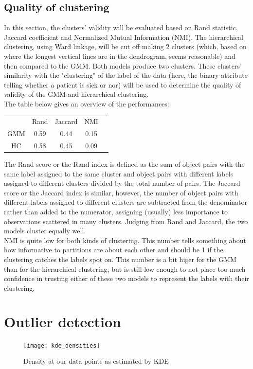\subsection{Quality of clustering}
In this section, the clusters' validity will be evaluated based on Rand statistic,
Jaccard coefficient and Normalized Mutual Information (NMI). The hierarchical clustering,
using Ward linkage, will be cut off making 2 clusters (which, based on where the
longest vertical lines are in the dendrogram, seems reasonable) and then
compared to the GMM. Both models produce two clusters. These clusters' similarity
with the "clustering" of the label of the data (here, the binary attribute telling
whether a patient is sick or nor) will be used to determine the quality of validity
of the GMM and hierarchical clustering.\\
 The table below gives an overview of the performances:\\
\begin{table}[h]
\centering
\begin{tabular}{ccccc}
    & Rand & Jaccard & NMI\\
GMM & 0.59 & 0.44 & 0.15 \\
HC & 0.58 & 0.45 & 0.09 \\
\end{tabular}
\end{table}

The Rand score or the Rand index is defined as the sum of object pairs with
the same label assigned to the same cluster and object pairs with different
labels assigned to different clusters divided by the total number of pairs. The
Jaccard score or the Jaccard index is similar, however, the number of object
pairs with different labels assigned to different clusters are subtracted from
the denominator rather than added to the numerator, assigning (usually) less
importance to observations scattered in many clusters. Judging from Rand and
Jaccard, the two models cluster equally well.\\
NMI is quite low for both kinds of clustering. This number tells something about
how informative to partitions are about each other and should be 1 if the clustering
catches the labels spot on. This number is a bit higer for the GMM than for the hierarchical
clustering, but is still low enough to not place too much confidence in trusting either
of these two models to represent the labels with their clustering.

\section{Outlier detection}
\begin{figure}[htbp]
  \centering
  \texttt{[image: kde\_densities]}
  \caption{Density at our data points as estimated by KDE}
  \label{fig:kde}
\end{figure}

